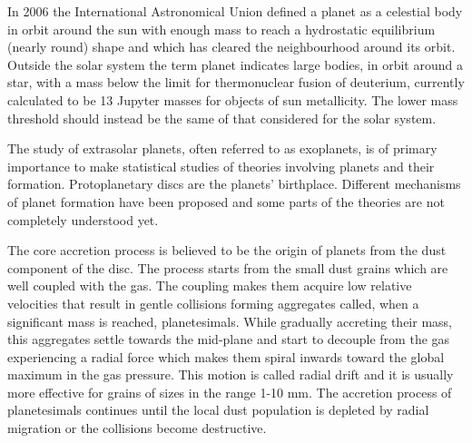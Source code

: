 \documentclass[a4paper,10pt]{report}
\begin{document}

In 2006 the International Astronomical Union defined a planet as a celestial body in orbit around the sun with enough mass 
to reach a hydrostatic equilibrium (nearly round) shape and which has cleared the neighbourhood around its orbit. Outside the solar system 
the term planet indicates large bodies, in orbit around a star,
with a mass below the limit for thermonuclear fusion of deuterium, 
currently calculated to be 13 Jupyter masses for objects of sun metallicity. The lower mass threshold should instead be the same of that considered
for the solar system.

The study of extrasolar planets, often referred to as exoplanets, is of primary importance to make statistical studies of theories 
involving planets and their formation. Protoplanetary discs are the planets' birthplace. 
Different mechanisms of planet formation have been proposed and some parts of the theories are not completely
understood yet. 

The core accretion process is believed to be the origin of planets from the dust component of the disc. 
The process starts from the small dust grains which are well coupled with the gas.
The coupling makes them acquire low relative velocities that result in gentle collisions forming aggregates called, when a significant mass is reached, planetesimals.
While gradually accreting their mass, this aggregates settle towards the mid-plane and start to decouple from the gas experiencing a radial force 
which makes them spiral inwards toward the global maximum in the gas pressure. This motion is called radial drift and it is usually more effective for grains of sizes in the range 
1-10 mm.
The accretion process of planetesimals continues until the local dust population is depleted by radial migration or the collisions become destructive.
\end{document}
